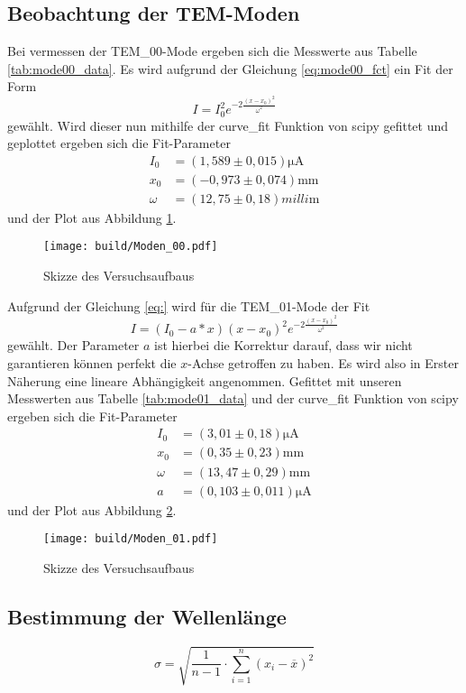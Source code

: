 \subsection{Beobachtung der TEM-Moden}
Bei vermessen der TEM_{00}-Mode ergeben sich die Messwerte aus Tabelle \ref{tab:mode00_data}. 
Es wird aufgrund der Gleichung \eqref{eq:mode00_fct} ein Fit der Form
\begin{equation}
  I=I_0^2e^{-2\frac{(x-x_0)^2}{\omega^2}}
\end{equation}
gewählt. Wird dieser nun mithilfe der curve\_fit Funktion von scipy \cite{scipy} gefittet und geplottet ergeben sich die Fit-Parameter
\begin{align}
  I_0&=(1,589\pm0,015)\si{\micro\ampere}\nonumber\\
  x_0&=(-0,973\pm0,074)\si{\milli\meter}\nonumber\\
  \omega&=(12,75\pm0,18)\si{milli\meter}
\end{align}
und der Plot aus Abbildung \ref{fig:Mode_00}.
\begin{figure}
  \centering
  \texttt{[image: build/Moden\_00.pdf]}
  \caption{Skizze des Versuchsaufbaus}
  \label{fig:Mode_00}
\end{figure}
Aufgrund der Gleichung \eqref{eq:} wird für die TEM_{01}-Mode der Fit 
\begin{equation}
  I=(I_0-a*x)(x-x_0)^2e^{-2\frac{(x-x_0)^2}{\omega^2}}
\end{equation}
gewählt. Der Parameter $a$ ist hierbei die Korrektur darauf, dass wir nicht garantieren können perfekt die $x$-Achse getroffen zu haben.
Es wird also in Erster Näherung eine lineare Abhängigkeit angenommen.
Gefittet mit unseren Messwerten aus Tabelle \ref{tab:mode01_data} und der curve\_fit Funktion von scipy \cite{scipy} ergeben sich die Fit-Parameter 
\begin{align}
  I_0&=(3,01\pm0,18)\si{\micro\ampere}\nonumber\\
  x_0&=(0,35\pm0,23)\si{\milli\meter}\nonumber\\
  \omega&=(13,47\pm0,29)\si{\milli\meter}\nonumber\\
  a&=(0,103\pm0,011)\si{\micro\ampere}
\end{align}
und der Plot aus Abbildung \ref{fig:Mode_01}.

\begin{figure}
  \centering
  \texttt{[image: build/Moden\_01.pdf]}
  \caption{Skizze des Versuchsaufbaus}
  \label{fig:Mode_01}
\end{figure}


\subsection{Bestimmung der Wellenlänge}

\begin{equation}
  \sigma = \sqrt{\frac{1}{n-1} \cdot \sum_{i=1}^n(x_i-\overline{x})^2}
  \label{eqn:Stdabweichung}
\end{equation}